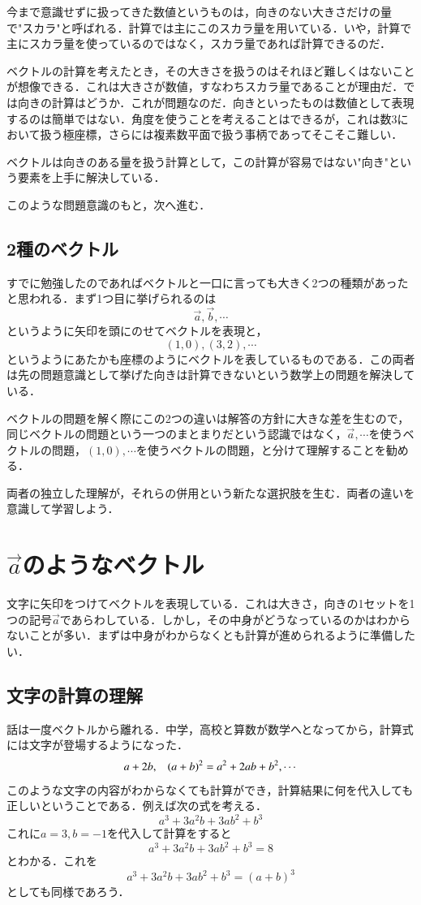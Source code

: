     今まで意識せずに扱ってきた数値というものは，向きのない大きさだけの量で"スカラ"と呼ばれる．計算では主にこのスカラ量を用いている．いや，計算で主にスカラ量を使っているのではなく，スカラ量であれば計算できるのだ．

    ベクトルの計算を考えたとき，その大きさを扱うのはそれほど難しくはないことが想像できる．これは大きさが数値，すなわちスカラ量であることが理由だ．では向きの計算はどうか．これが問題なのだ．向きといったものは数値として表現するのは簡単ではない．角度を使うことを考えることはできるが，これは数3において扱う極座標，さらには複素数平面で扱う事柄であってそこそこ難しい．

    ベクトルは向きのある量を扱う計算として，この計算が容易ではない"向き"という要素を上手に解決している．

    このような問題意識のもと，次へ進む．

    \subsection{2種のベクトル}
    すでに勉強したのであればベクトルと一口に言っても大きく2つの種類があったと思われる．まず1つ目に挙げられるのは
    \[
    \vec{a},\vec{b},\cdots
    \]
    というように矢印を頭にのせてベクトルを表現と，
    \[
    (1,0),(3,2),\cdots
    \]
    というようにあたかも座標のようにベクトルを表しているものである．この両者は先の問題意識として挙げた向きは計算できないという数学上の問題を解決している．

    ベクトルの問題を解く際にこの2つの違いは解答の方針に大きな差を生むので，同じベクトルの問題という一つのまとまりだという認識ではなく，$\vec{a},\cdots$を使うベクトルの問題，$(1,0),\cdots$を使うベクトルの問題，と分けて理解することを勧める．

    両者の独立した理解が，それらの併用という新たな選択肢を生む．両者の違いを意識して学習しよう．

    \section{$\vec{a}$のようなベクトル}
    文字に矢印をつけてベクトルを表現している．これは大きさ，向きの1セットを1つの記号$\vec{a}$であらわしている．しかし，その中身がどうなっているのかはわからないことが多い．まずは中身がわからなくとも計算が進められるように準備したい．

    \subsection{文字の計算の理解}
    話は一度ベクトルから離れる．中学，高校と算数が数学へとなってから，計算式には文字が登場するようになった．
    \[
    a+2b,\hspace{3mm} (a+b)^2=a^2+2ab+b^2,\cdots
    \]
    このような文字の内容がわからなくても計算ができ，計算結果に何を代入しても正しいということである．例えば次の式を考える．
    \[
    a^3+ 3a^2b +3 ab^2 +b^3
    \]
    これに$a=3,b=-1$を代入して計算をすると
    \[
    a^3+ 3a^2b +3 ab^2 +b^3=8
    \]
    とわかる．これを
    \[
    a^3+ 3a^2b +3 ab^2 +b^3=(a+b)^3
    \]
    としても同様であろう．

